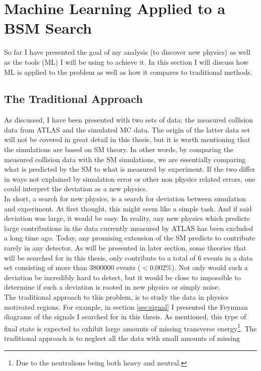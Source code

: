 \section{Machine Learning Applied to a BSM Search}\label{sec:MLHEP}
So far I have presented the goal of my analysis (to discover new physics)
as well as the tools (\ac{ML}) I will be using to achieve it. In this section
I will discuss how \ac{ML} is applied to the problem as well as how it compares
to traditional methods.
\subsection{The Traditional Approach}
As discussed, I have been presented with two sets of data; the measured collision 
data from \ac{ATLAS} and the simulated \ac{MC} data. The origin of the latter data set 
will not be covered in great detail in this thesis, but it is worth mentioning that 
the simulations are based on \ac{SM} theory. In other words, by comparing the measured collision 
data with the \ac{SM} simulations, we are essentially comparing what is predicted by the \ac{SM} 
to what is measured by experiment. If the two differ in ways not explained by simulation error 
or other non physics related errors, one could interpret the deviation as a new physics.
\\
In short, a search for new physics, is a search for deviation between simulation and 
experiment. At first thought, this might seem like a simple task. And if said deviation 
was large, it would be easy. In reality, any new physics which predicts large contributions 
in the data currently measured by \ac{ATLAS} has been excluded a long time ago. Today, any
promising extension of the \ac{SM} predicts to contribute rarely in any detector. As will 
be presented in later section, some theories that will be searched for in this thesis, only 
contribute to a total of 6 events in a data set consisting of more than $3800000$ events 
($<0.002\%$). Not only would such a deviation be incredibly hard to detect, but it would 
be close to impossible to determine if such a deviation is rooted in new physics or simply 
noise. 
\\
The traditional approach to this problem, is to study the data in physics motivated regions. 
For example, in section \ref{sec:signal} I presented the Feynman diagrams of the signals I 
searched for in this thesis. As mentioned, this type of final state is expected to exhibit 
large amounts of missing transverse energy\footnote{Due to the neutralions being both heavy 
and neutral.}. The traditional approach is to neglect all the data with small amounts of missing 
